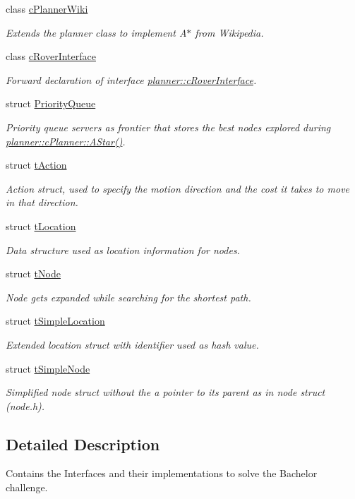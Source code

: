 \begin{DoxyCompactItemize}
class \mbox{\hyperlink{classplanner_1_1c_planner_wiki}{c\+Planner\+Wiki}}
\begin{DoxyCompactList}\small\item\em Extends the planner class to implement A$\ast$ from Wikipedia. \end{DoxyCompactList}\item 
class \mbox{\hyperlink{classplanner_1_1c_rover_interface}{c\+Rover\+Interface}}
\begin{DoxyCompactList}\small\item\em Forward declaration of interface \mbox{\hyperlink{classplanner_1_1c_rover_interface}{planner\+::c\+Rover\+Interface}}. \end{DoxyCompactList}\item 
struct \mbox{\hyperlink{structplanner_1_1_priority_queue}{Priority\+Queue}}
\begin{DoxyCompactList}\small\item\em Priority queue servers as frontier that stores the best nodes explored during \mbox{\hyperlink{classplanner_1_1c_planner_a341e70531266f023ac9461d18979d1ef}{planner\+::c\+Planner\+::\+A\+Star()}}. \end{DoxyCompactList}\item 
struct \mbox{\hyperlink{structplanner_1_1t_action}{t\+Action}}
\begin{DoxyCompactList}\small\item\em Action struct, used to specify the motion direction and the cost it takes to move in that direction. \end{DoxyCompactList}\item 
struct \mbox{\hyperlink{structplanner_1_1t_location}{t\+Location}}
\begin{DoxyCompactList}\small\item\em Data structure used as location information for nodes. \end{DoxyCompactList}\item 
struct \mbox{\hyperlink{structplanner_1_1t_node}{t\+Node}}
\begin{DoxyCompactList}\small\item\em Node gets expanded while searching for the shortest path. \end{DoxyCompactList}\item 
struct \mbox{\hyperlink{structplanner_1_1t_simple_location}{t\+Simple\+Location}}
\begin{DoxyCompactList}\small\item\em Extended location struct with identifier used as hash value. \end{DoxyCompactList}\item 
struct \mbox{\hyperlink{structplanner_1_1t_simple_node}{t\+Simple\+Node}}
\begin{DoxyCompactList}\small\item\em Simplified node struct without the a pointer to its parent as in node struct (node.\+h). \end{DoxyCompactList}\end{DoxyCompactItemize}


\subsection{Detailed Description}
Contains the Interfaces and their implementations to solve the Bachelor challenge. 